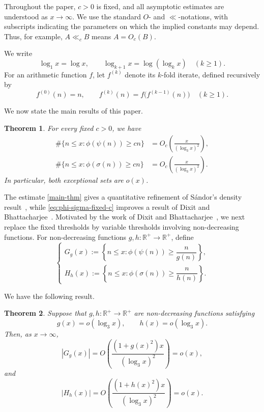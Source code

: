 \documentclass{article}
\newtheorem{theorem}{Theorem}[section]
\newcommand{\R}{\mathbb{R}}
\theoremstyle{remark}
\begin{document}
Throughout the paper, \(c>0\) is fixed, and all asymptotic estimates are
understood as \(x\to\infty\). We use the standard \(O\)- and
\(\ll\)-notations, with subscripts indicating the parameters on which
the implied constants may depend. Thus, for example,
\(A\ll_c B\) means \(A=O_c(B)\).

We write
\[
\log_1x=\log x,\qquad
\log_{k+1}x=\log(\log_kx)
\quad(k\ge1).
\]
For an arithmetic function \(f\), let \(f^{(k)}\) denote its \(k\)-fold
iterate, defined recursively by
\[
f^{(0)}(n)=n,\qquad
f^{(k)}(n)=f\bigl(f^{(k-1)}(n)\bigr)
\quad(k\ge1).
\]





We now state the main results of this paper.

\begin{theorem}\label{thm:fixed-c}
For every fixed \(c>0\), we have
\begin{align}
\#\{n\le x:\phi(\psi(n))\ge cn\}
&=
O_c\left(\frac{x}{(\log_3x)^2}\right),
\label{main-thm}\\
\#\{n\le x:\phi(\sigma(n))\ge cn\}
&=
O_c\left(\frac{x}{(\log_3x)^2}\right).
\label{eq:phi-sigma-fixed-c}
\end{align}
In particular, both exceptional sets are \(o(x)\).
\end{theorem}



The estimate \eqref{main-thm} gives a quantitative refinement
of Sándor's density result~\cite{Sándor}, while
\eqref{eq:phi-sigma-fixed-c} improves a result of Dixit and
Bhattacharjee~\cite{Bhattacharjee}. Motivated by the work of Dixit and Bhattacharjee~\cite{Bhattacharjee},
we next replace the fixed thresholds by variable thresholds involving non-decreasing functions. For non-decreasing functions
\(g,h:\R^+ \to \R^+\), define
\[
\begin{cases}
G_g(x) := \left\{ n \leq x : \phi(\psi(n)) \geq \dfrac{n}{g(n)} \right\}, \\[1em]
H_h(x) := \left\{ n \leq x : \phi(\sigma(n)) \geq \dfrac{n}{h(n)} \right\}.
\end{cases}
\]

We have the following result.

\begin{theorem}\label{thm-2}
Suppose that \(g,h:\mathbb{R}^+\to\mathbb{R}^+\) are non-decreasing
functions satisfying
\[
g(x)=o(\log_3x),
\qquad
h(x)=o(\log_3x).
\]
Then, as \(x\to\infty\),
\[
|G_g(x)|
=
O\left(
\frac{(1+g(x)^2)x}{(\log_3x)^2}
\right)
=o(x),
\]
and
\[
|H_h(x)|
=
O\left(
\frac{(1+h(x)^2)x}{(\log_3x)^2}
\right)
=o(x).
\]
\end{theorem}
\end{document}
